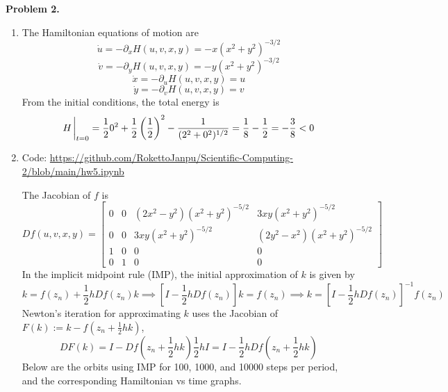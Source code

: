 \documentclass{article}
\def\tbf#1{\textbf{#1}}
\newcommand{\br}[1]{\left(#1\right)}
\newcommand{\sbr}[1]{\left[#1\right]}
\newcommand{\m}[2][b]{\begin{#1matrix}#2\end{#1matrix}}
\newcommand{\inv}{^{-1}}
\newcommand{\imp}{\implies}
\newcommand{\ptl}{\partial}
\begin{document}
\tbf{Problem 2.}

\begin{enumerate}[label=(\alph*)]
	
\item The Hamiltonian equations of motion are
$$\dot u = -\ptl_xH(u,v,x,y) = -x(x^2+y^2)^{-3/2}$$
$$\dot v = -\ptl_yH(u,v,x,y) = -y(x^2+y^2)^{-3/2}$$
$$\dot x = -\ptl_uH(u,v,x,y) = u$$
$$\dot y = -\ptl_vH(u,v,x,y) = v$$
From the initial conditions, the total energy is
$$H\eval_{t=0} = \frac120^2 + \frac12\br{\frac12}^2 - \frac{1}{(2^2+0^2)^{1/2}} = \frac18 - \frac12 = -\frac38 < 0$$


\item Code: \url{https://github.com/RokettoJanpu/Scientific-Computing-2/blob/main/hw5.ipynb}

The Jacobian of $f$ is
$$Df(u,v,x,y) = \m{
0 & 0 & (2x^2 - y^2)(x^2 + y^2)^{-5/2} & 3xy(x^2 + y^2)^{-5/2} \\
0 & 0 & 3xy(x^2 + y^2)^{-5/2} & (2y^2 - x^2)(x^2 + y^2)^{-5/2} \\
1 & 0 & 0 & 0\\
0 & 1 & 0 & 0
}$$
In the implicit midpoint rule (IMP), the initial approximation of $k$ is given by
$$k = f(z_n) + \frac12hDf(z_n)k
\imp \sbr{I - \frac12hDf(z_n)}k = f(z_n)
\imp k = \sbr{I - \frac12hDf(z_n)}\inv f(z_n)$$
Newton's iteration for approximating $k$ uses the Jacobian of $F(k):=k-f(z_n+\frac12hk)$,
$$DF(k) = I - Df\br{z_n + \frac12hk}\frac12hI = I - \frac12hDf\br{z_n + \frac12hk}$$
Below are the orbits using IMP for 100, 1000, and 10000 steps per period, and the corresponding Hamiltonian vs time graphs.


\end{enumerate}
\end{document}
